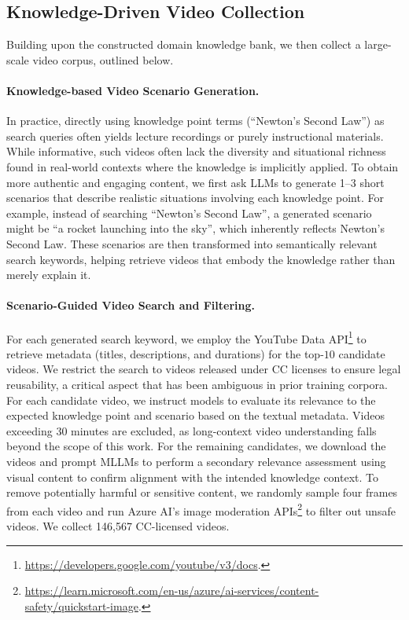 \subsection{Knowledge-Driven Video Collection}
Building upon the constructed domain knowledge bank, we then collect a large-scale video corpus, outlined below.

\vspace{-8pt}
\paragraph{Knowledge-based Video Scenario Generation.} In practice, directly using knowledge point terms (\eg ``Newton’s Second Law'') as search queries often yields lecture recordings or purely instructional materials.
While informative, such videos often lack the diversity and situational richness found in real-world contexts where the knowledge is implicitly applied. To obtain more authentic and engaging content, we first ask LLMs to generate 1–3 short scenarios that describe realistic situations involving each knowledge point. For example, instead of searching ``Newton’s Second Law'', a generated scenario might be ``a rocket launching into the sky'', which inherently reflects Newton’s Second Law.
These scenarios are then transformed into semantically relevant search keywords, helping retrieve videos that embody the knowledge rather than merely explain it.

\vspace{-8pt}
\paragraph{Scenario-Guided Video Search and Filtering.}
For each generated search keyword, we employ the YouTube Data API\footnote{\href{https://developers.google.com/youtube/v3/docs}{https://developers.google.com/youtube/v3/docs}.} to retrieve metadata (\eg titles, descriptions, and durations) for the top-$10$ candidate videos. 
We restrict the search to videos released under CC licenses to ensure legal reusability,
a critical aspect that has been ambiguous in prior training corpora. 
For each candidate video, we instruct models to evaluate its relevance to the expected knowledge point and scenario based on the textual metadata. 
Videos exceeding 30 minutes are excluded, as long-context video understanding falls beyond the scope of this work. 
For the remaining candidates, we download the videos and prompt MLLMs to perform a secondary relevance assessment using visual content to confirm alignment with the intended knowledge context.
To remove potentially harmful or sensitive content, we randomly sample four frames from each video and run Azure AI's image moderation APIs\footnote{\href{https://learn.microsoft.com/azure/ai-services/content-safety/quickstart-image}{https://learn.microsoft.com/en-us/azure/ai-services/content-safety/quickstart-image}.} to filter out unsafe videos.
We collect 146,567 CC-licensed videos.


